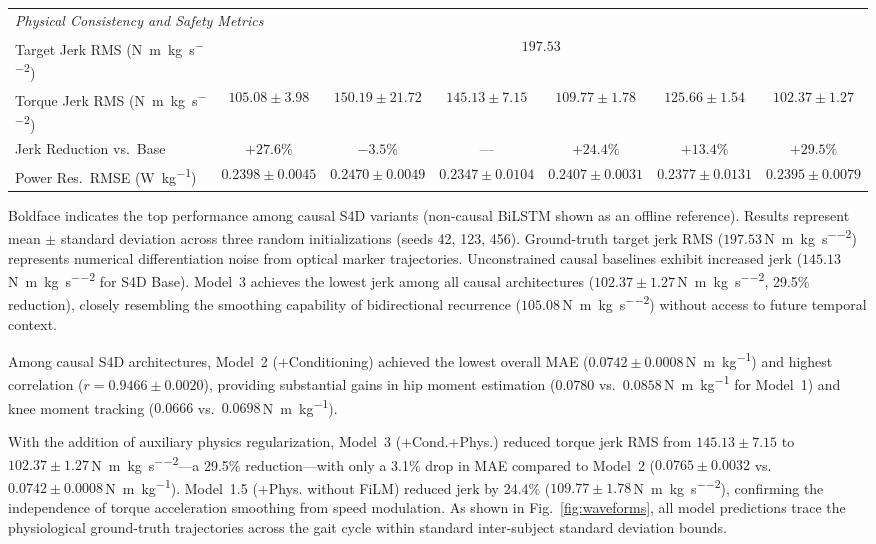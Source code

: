 \documentclass[fleqn,10pt]{wlscirep}
\newcommand{\Nmskg}{\si{\newton\metre\per\kilogram}}
\newcommand{\Nmskgsq}{\si{\newton\metre\per\kilogram\per\second\squared}}
\newcommand{\Wkg}{\si{\watt\per\kilogram}}
\begin{document}
\begin{table}[ht]
{\begin{tabular}{@{}l cccccc@{}}
\midrule
\multicolumn{7}{l}{\emph{Physical Consistency and Safety Metrics}} \\
Target Jerk RMS (\Nmskgsq) & \multicolumn{6}{c}{$197.53$} \\
Torque Jerk RMS (\Nmskgsq) & $105.08 \pm 3.98$ & $150.19 \pm 21.72$ & $145.13 \pm 7.15$ & $109.77 \pm 1.78$ & $125.66 \pm 1.54$ & $\mathbf{102.37 \pm 1.27}$ \\
Jerk Reduction vs.\ Base & $+27.6\%$ & $-3.5\%$ & --- & $+24.4\%$ & $+13.4\%$ & $\mathbf{+29.5\%}$ \\
Power Res.\ RMSE (\Wkg) & $0.2398 \pm 0.0045$ & $0.2470 \pm 0.0049$ & $\mathbf{0.2347 \pm 0.0104}$ & $0.2407 \pm 0.0031$ & $0.2377 \pm 0.0131$ & $0.2395 \pm 0.0079$ \\
\bottomrule
\end{tabular}%
}
\par\vspace{1.5mm}
{\raggedright\footnotesize Boldface indicates the top performance among causal S4D variants (non-causal BiLSTM shown as an offline reference). Results represent mean $\pm$ standard deviation across three random initializations (seeds 42, 123, 456). Ground-truth target jerk RMS ($197.53$\,\Nmskgsq{}) represents numerical differentiation noise from optical marker trajectories. Unconstrained causal baselines exhibit increased jerk ($145.13$\,\Nmskgsq{} for S4D Base). Model~3 achieves the lowest jerk among all causal architectures ($102.37 \pm 1.27$\,\Nmskgsq{}, 29.5\% reduction), closely resembling the smoothing capability of bidirectional recurrence ($105.08$\,\Nmskgsq{}) without access to future temporal context.\par}
\end{table}

Among causal S4D architectures, Model~2 (+Conditioning) achieved the lowest overall MAE ($0.0742 \pm 0.0008$\,\Nmskg{}) and highest correlation ($r = 0.9466 \pm 0.0020$), providing substantial gains in hip moment estimation ($0.0780$ vs.\ $0.0858$\,\Nmskg{} for Model~1) and knee moment tracking ($0.0666$ vs.\ $0.0698$\,\Nmskg{}).

With the addition of auxiliary physics regularization, Model~3 (+Cond.+Phys.) reduced torque jerk RMS from $145.13 \pm 7.15$ to $102.37 \pm 1.27$\,\Nmskgsq{}---a 29.5\% reduction---with only a 3.1\% drop in MAE compared to Model~2 ($0.0765 \pm 0.0032$ vs.\ $0.0742 \pm 0.0008$\,\Nmskg{}). Model~1.5 (+Phys. without FiLM) reduced jerk by 24.4\% ($109.77 \pm 1.78$\,\Nmskgsq{}), confirming the independence of torque acceleration smoothing from speed modulation. As shown in Fig.~\ref{fig:waveforms}, all model predictions trace the physiological ground-truth trajectories across the gait cycle within standard inter-subject standard deviation bounds.
\end{document}
